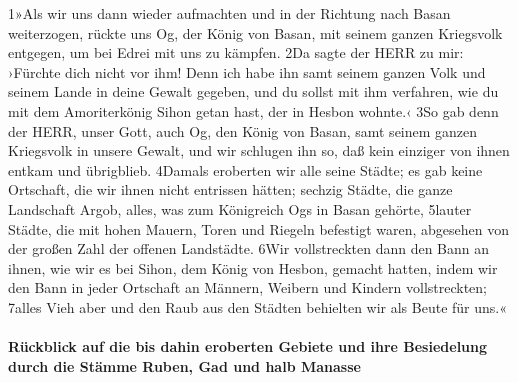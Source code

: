 1»Als wir uns dann wieder aufmachten und in der Richtung nach Basan
weiterzogen, rückte uns Og, der König von Basan, mit seinem ganzen
Kriegsvolk entgegen, um bei Edrei mit uns zu kämpfen. 2Da sagte der HERR
zu mir: ›Fürchte dich nicht vor ihm! Denn ich habe ihn samt seinem
ganzen Volk und seinem Lande in deine Gewalt gegeben, und du sollst mit
ihm verfahren, wie du mit dem Amoriterkönig Sihon getan hast, der in
Hesbon wohnte.‹ 3So gab denn der HERR, unser Gott, auch Og, den König
von Basan, samt seinem ganzen Kriegsvolk in unsere Gewalt, und wir
schlugen ihn so, daß kein einziger von ihnen entkam und übrigblieb.
4Damals eroberten wir alle seine Städte; es gab keine Ortschaft, die wir
ihnen nicht entrissen hätten; sechzig Städte, die ganze Landschaft
Argob, alles, was zum Königreich Ogs in Basan gehörte, 5lauter Städte,
die mit hohen Mauern, Toren und Riegeln befestigt waren, abgesehen von
der großen Zahl der offenen Landstädte. 6Wir vollstreckten dann den Bann
an ihnen, wie wir es bei Sihon, dem König von Hesbon, gemacht hatten,
indem wir den Bann in jeder Ortschaft an Männern, Weibern und Kindern
vollstreckten; 7alles Vieh aber und den Raub aus den Städten behielten
wir als Beute für uns.«

\hypertarget{ruxfcckblick-auf-die-bis-dahin-eroberten-gebiete-und-ihre-besiedelung-durch-die-stuxe4mme-ruben-gad-und-halb-manasse}{%
\paragraph{Rückblick auf die bis dahin eroberten Gebiete und ihre
Besiedelung durch die Stämme Ruben, Gad und halb
Manasse}\label{ruxfcckblick-auf-die-bis-dahin-eroberten-gebiete-und-ihre-besiedelung-durch-die-stuxe4mme-ruben-gad-und-halb-manasse}}

